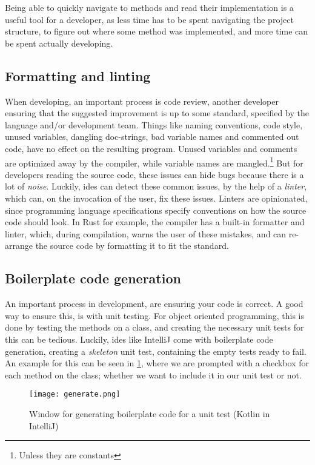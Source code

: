Being able to quickly navigate to methods and read their implementation is a
useful tool for a developer, as less time has to be spent navigating the project
structure, to figure out where some method was implemented, and more time can be
spent actually developing.

\subsection{Formatting and linting}

When developing, an important process is code review, another developer ensuring
that the suggested improvement is up to some standard, specified by the
language and/or development team. Things like naming conventions, code style,
unused variables, dangling doc-strings, bad variable names and commented out
code, have no effect on the resulting program. Unused variables and comments
are optimized away by the compiler, while variable names are mangled.\footnote{Unless they are constants}
But for developers reading the source code, these issues can hide bugs because
there is a lot of \textit{noise}. Luckily, \gls*{ide}s can detect these common
issues, by the help of a \textit{linter}, which can, on the invocation of the
user, fix these issues. Linters are opinionated, since programming language
specifications specify conventions on how the source code should look. In Rust
for example, the compiler has a built-in formatter and linter, which, during
compilation, warns the user of these mistakes, and can re-arrange the source
code by formatting it to fit the standard.

\subsection{Boilerplate code generation}

An important process in development, are ensuring your code is correct. A good
way to ensure this, is with unit testing. For object oriented programming, this
is done by testing the methods on a class, and creating the necessary unit tests
for this can be tedious. Luckily, \gls*{ide}s like IntelliJ come with
boilerplate code generation, creating a \textit{skeleton} unit test, containing
the empty tests ready to fail. An example for this can be seen in
\ref{pic:generate}, where we are prompted with a checkbox for each method on
the class; whether we want to include it in our unit test or not.

\begin{figure}
  \centering
  \texttt{[image: generate.png]}
  \caption{
    Window for generating boilerplate code for a unit test (Kotlin in
    IntelliJ)
  }
  \label{pic:generate}
\end{figure}

